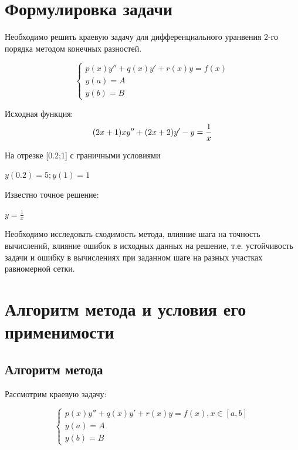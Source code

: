 






\section{Формулировка задачи}

Необходимо решить краевую задачу для дифференциального уранвения 2-го порядка методом конечных разностей.

\begin{equation}
	\begin{cases}
		p(x)y''+q(x)y'+r(x)y=f(x) \\
		y(a)= A \\
		y(b) = B 	
	\end{cases}
\end{equation}

Исходная функция: 
\begin{equation}
	(2x+1)xy''+(2x+2)y'-y=\frac{1}{x} \\
\end{equation}

На отрезке [0.2;1] с граничными условиями

\begin{math}
	y(0.2)= 5 ;
	y(1) = 1 
\end{math}

Известно точное решение:

\begin{math}
	y=\frac{1}{x}
\end{math}

Необходимо исследовать сходимость метода, влияние шага на точность вычислений, влияние ошибок в исходных данных на решение, т.е. устойчивость задачи и ошибку в вычислениях при заданном шаге на разных участках равномерной сетки. 

\section{Алгоритм метода и условия его применимости}


\subsection{Алгоритм метода}

Рассмотрим краевую задачу: 

\begin{equation}
	\begin{cases}
		p(x)y''+q(x)y'+r(x)y=f(x), x \in [a,b] \\
		y(a)= A \\
		y(b) = B 	
	\end{cases}
\end{equation}

